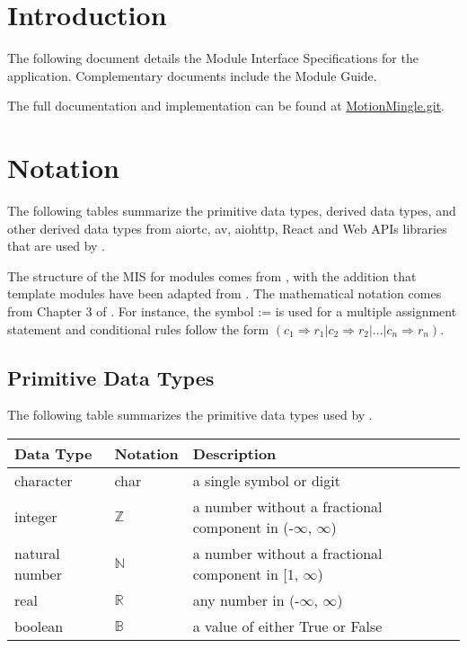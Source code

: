 \documentclass[12pt, titlepage]{article}
\begin{document}

\section{Introduction}

The following document details the Module Interface Specifications for the
\projname application. Complementary documents include the Module Guide.

The full documentation and implementation can be found at \href{https://github.com/InfiniView-AI/MotionMingle}{MotionMingle.git}.


\section{Notation}

The following tables summarize the primitive data types, derived data types, and
other derived data types from aiortc, av, aiohttp, React and Web APIs libraries
that are used by \projname.

The structure of the MIS for modules comes from \citet{HoffmanAndStrooper1995},
with the addition that template modules have been adapted from
\cite{GhezziEtAl2003}.  The mathematical notation comes from Chapter 3 of
\citet{HoffmanAndStrooper1995}.  For instance, the symbol := is used for a
multiple assignment statement and conditional rules follow the form $(c_1
\Rightarrow r_1 | c_2 \Rightarrow r_2 | ... | c_n \Rightarrow r_n )$.

\subsection{Primitive Data Types}

The following table summarizes the primitive data types used by \projname.

\begin{center}
  \renewcommand{\arraystretch}{1.2}
  \noindent
  \begin{tabular}{l l p{7.5cm}}
    \toprule
    \textbf{Data Type} & \textbf{Notation} & \textbf{Description} \\
    \midrule
    character & char & a single symbol or digit \\
    integer & $\mathbb{Z}$ & a number without a fractional component in (-$\infty$, $\infty$) \\
    natural number & $\mathbb{N}$ & a number without a fractional component in [1, $\infty$) \\
    real & $\mathbb{R}$ & any number in (-$\infty$, $\infty$) \\
    boolean & $\mathbb{B}$ & a value of either True or False \\
    \bottomrule
  \end{tabular}
\end{center}
\end{document}
